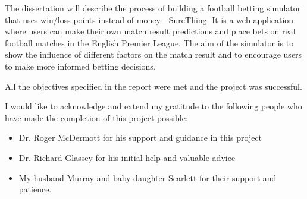\beforeabstract
{}
The dissertation will describe the process of building a football betting simulator that uses win/loss points instead of money - SureThing. It is a web application where users can make their own match result predictions and place bets on real football matches in the English Premier League. The aim of the simulator is to show the influence of different factors on the match result and to encourage users to make more informed betting decisions.

All the objectives specified in the report were met and the project was successful.

I would like to acknowledge and extend my gratitude to the following people who have made the completion of this project possible:

\begin{itemize}
	 \item Dr. Roger McDermott for his support and guidance in this project
	 \item Dr. Richard Glassey for his initial help and valuable advice
	 \item My husband Murray and baby daughter Scarlett for their support and patience.
\end{itemize}

\afterpreface
\afterabstract
